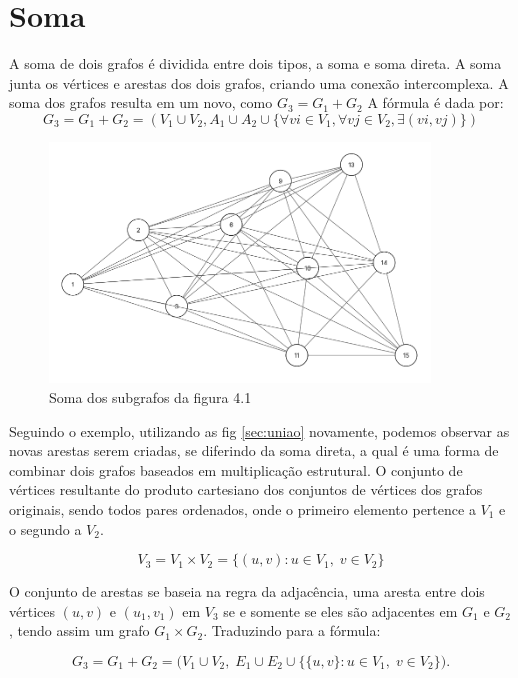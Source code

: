 \section{Soma}\label{sec:soma}
A soma de dois grafos é dividida entre dois tipos, a soma e soma direta.
A soma junta os vértices e arestas dos dois grafos, criando uma conexão intercomplexa. A soma dos grafos resulta em um novo, como $G_3 = G_1 + G_2$ A fórmula é dada por:
\[
	G_3 = G_1 + G_2 = (V_1 \cup V_2, A_1 \cup A_2 \cup \{ \forall vi \in V_1, \forall vj \in V_2, \exists(vi, vj) \})
\]

\begin{figure}[!h]
	\centering
	\includegraphics[width=0.9\textwidth]{figuras/soma_NOVO.png}
	\caption{Soma dos subgrafos da figura 4.1}
	\label{fig:somaGrafos}
\end{figure}

Seguindo o exemplo, utilizando as fig \ref{sec:uniao} novamente, podemos observar as novas arestas serem criadas, se diferindo da soma direta, a qual é uma forma de combinar dois grafos baseados em multiplicação estrutural. O conjunto de vértices resultante do produto cartesiano dos conjuntos de vértices dos grafos originais, sendo todos pares ordenados, onde o primeiro elemento pertence a $V_1$ e o segundo a $V_2$.

\[
	V_3 = V_1 \times V_2 = \{(u,v):u\in V_1,\; v\in V_2\}
\]

O conjunto de arestas se baseia na regra da adjacência, uma aresta entre dois vértices $(u, v)$ e $(u_1, v_1)$ em $V_3$ se e somente se eles são adjacentes em $G_1$ e $G_2$, tendo assim um grafo  $G_1 \times G_2$. Traduzindo para a fórmula:

\[ %
	G_3 = G_1+G_2=\big(V_1\cup V_2,\;E_1\cup E_2\cup \{\{u,v\}:u\in V_1,\; v\in V_2\}\big).
\]

